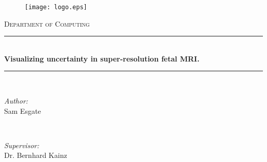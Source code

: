 \begin{titlepage}

\newcommand{\HRule}{\rule{\linewidth}{0.3mm}} %


\begin{figure}
  \begin{flushleft}%
	\texttt{[image: logo.eps]}\\[2cm] %
  \end{flushleft}
\end{figure}

\center %
 

\textsc{\Large Department of Computing}\\[0.5cm] %


\HRule \\[0.4cm]
{ \LARGE \bfseries Visualizing uncertainty in super-resolution fetal MRI.}\\[0cm] %
\HRule \\[1.5cm]
 

\begin{minipage}{0.4\textwidth}
\begin{flushleft} \large
\emph{Author:}\\
Sam Esgate %
\end{flushleft}
\end{minipage}
~
\begin{minipage}{0.4\textwidth}
\begin{flushright} \large
\emph{Supervisor:} \\
Dr. Bernhard Kainz %
\end{flushright}
\end{minipage}\\[7cm]


\end{titlepage}
